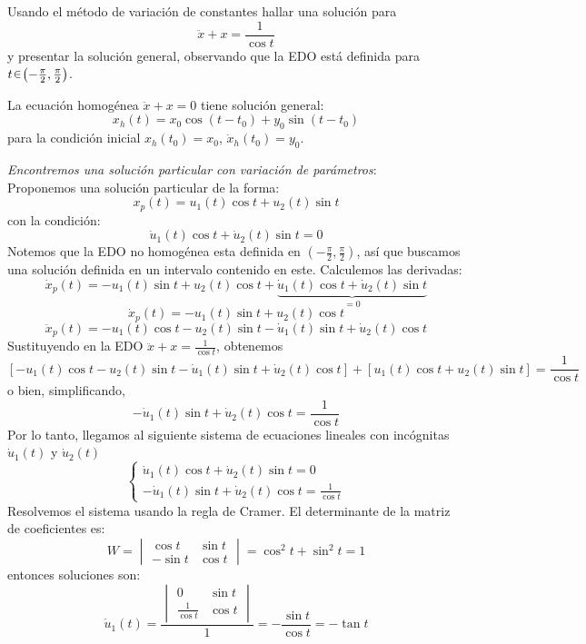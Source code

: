 \begin{ejer}
Usando el método de variación de constantes hallar una solución para
\[
\ddot{x} + x = \frac{1}{\cos t}
\]
y presentar la solución general, observando que la EDO
está definida para $t \en \left(-\tfrac{\pi}{2}, \tfrac{\pi}{2}\right)$.
\end{ejer}
\begin{sol}
La ecuación homogénea $\ddot{x} + x = 0$ tiene solución general:
\[
x_h(t) = x_0 \cos(t-t_0) + y_0 \sin(t-t_0)
\]
para la condición inicial $x_h(t_0) = x_0$, $\dot{x}_h(t_0) = y_0$.\par\vspace{1em}
\emph{Encontremos una solución particular con variación de parámetros}:\\
Proponemos una solución particular de la forma:
\[
x_p(t) = u_1(t)\cos t + u_2(t)\sin t
\]
con la condición:
\[
\dot{u}_1(t)\cos t + \dot{u}_2(t)\sin t = 0
\]
Notemos que la EDO no homogénea esta definida en $(-\frac{\pi}{2}, \frac{\pi}{2})$, así que buscamos una solución definida en un intervalo contenido en este.
Calculemos las derivadas:
\[
\dot{x}_p(t) = -u_1(t)\sin t + u_2(t)\cos t + \underbrace{\dot{u}_1(t)\cos t + \dot{u}_2(t)\sin t}_{=0}
\]
\[
\dot{x}_p(t) = -u_1(t)\sin t + u_2(t)\cos t
\]
\[
\ddot{x}_p(t) = -u_1(t)\cos t - u_2(t)\sin t - \dot{u}_1(t)\sin t + \dot{u}_2(t)\cos t
\]
Sustituyendo en la EDO $\ddot{x} + x = \frac{1}{\cos t}$, obtenemos
\[
[-u_1(t)\cos t - u_2(t)\sin t - \dot{u}_1(t)\sin t + \dot{u}_2(t)\cos t] + [u_1(t)\cos t + u_2(t)\sin t] = \frac{1}{\cos t}
\]
o bien, simplificando,
\[
- \dot{u}_1(t)\sin t + \dot{u}_2(t)\cos t = \frac{1}{\cos t}
\]
Por lo tanto, llegamos al siguiente sistema de ecuaciones lineales con incógnitas $\dot{u}_1(t)$ y $\dot{u}_2(t)$
\[
\begin{cases}
\dot{u}_1(t)\cos t + \dot{u}_2(t)\sin t = 0 \\
- \dot{u}_1(t)\sin t + \dot{u}_2(t)\cos t = \frac{1}{\cos t}
\end{cases}
\]
Resolvemos el sistema usando la regla de Cramer. El determinante de la matriz de coeficientes es:
\[
W = \begin{vmatrix}
\cos t & \sin t \\
-\sin t & \cos t
\end{vmatrix} = \cos^2 t + \sin^2 t = 1
\]
entonces soluciones son:
\[
\dot{u}_1(t) = \frac{\begin{vmatrix}
0 & \sin t \\
\frac{1}{\cos t} & \cos t
\end{vmatrix}}{1} = -\frac{\sin t}{\cos t} = -\tan t
\]
\end{sol}
